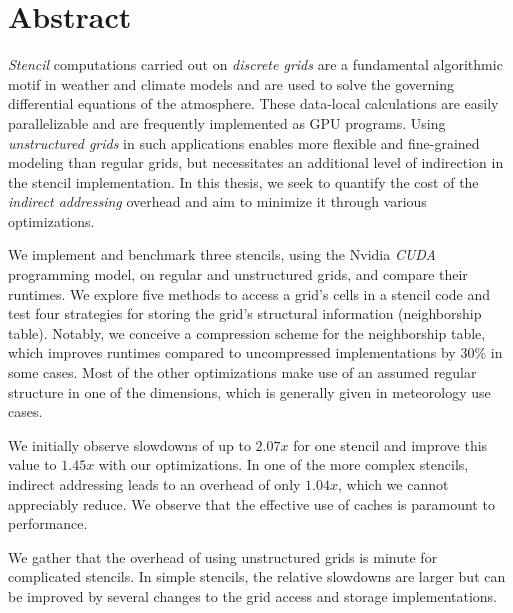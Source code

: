 \chapter*{Abstract}

\emph{Stencil} computations carried out on \emph{discrete grids} are a fundamental algorithmic motif in weather and climate models and are used to solve the governing differential equations of the atmosphere. These data-local calculations are easily parallelizable and are frequently implemented as GPU programs. Using \emph{unstructured grids} in such applications enables more flexible and fine-grained modeling than regular grids, but necessitates an additional level of indirection in the stencil implementation. In this thesis, we seek to quantify the cost of the \emph{indirect addressing} overhead and aim to minimize it through various optimizations.

We implement and benchmark three stencils, using the Nvidia \emph{CUDA} programming model, on regular and unstructured grids, and compare their runtimes. We explore five methods to access a grid's cells in a stencil code and test four strategies for storing the grid's structural information (neighborship table). Notably, we conceive a compression scheme for the neighborship table, which improves runtimes compared to uncompressed implementations by $30\%$ in some cases. Most of the other optimizations make use of an assumed regular structure in one of the dimensions, which is generally given in meteorology use cases.

We initially observe slowdowns of up to $2.07x$ for one stencil and improve this value to $1.45x$ with our optimizations. In one of the more complex stencils, indirect addressing leads to an overhead of only $1.04x$, which we cannot appreciably reduce. We observe that the effective use of caches is paramount to performance.

We gather that the overhead of using unstructured grids is minute for complicated stencils. In simple stencils, the relative slowdowns are larger but can be improved by several changes to the grid access and storage implementations.




